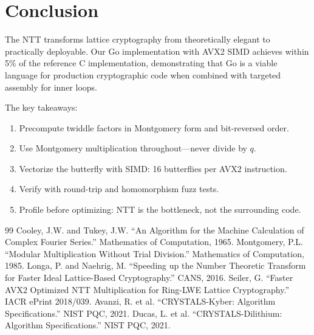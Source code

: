 \section{Conclusion}


The NTT transforms lattice cryptography from theoretically elegant to practically
deployable. Our Go implementation with AVX2 SIMD achieves within 5\% of the reference C
implementation, demonstrating that Go is a viable language for production cryptographic
code when combined with targeted assembly for inner loops.

The key takeaways:
\begin{enumerate}[nosep]
  \item Precompute twiddle factors in Montgomery form and bit-reversed order.
  \item Use Montgomery multiplication throughout---never divide by $q$.
  \item Vectorize the butterfly with SIMD: 16 butterflies per AVX2 instruction.
  \item Verify with round-trip and homomorphism fuzz tests.
  \item Profile before optimizing: NTT is the bottleneck, not the surrounding code.
\end{enumerate}

\begin{thebibliography}{99}
 Cooley, J.W. and Tukey, J.W. ``An Algorithm for the Machine Calculation of Complex Fourier Series.'' Mathematics of Computation, 1965.
 Montgomery, P.L. ``Modular Multiplication Without Trial Division.'' Mathematics of Computation, 1985.
 Longa, P. and Naehrig, M. ``Speeding up the Number Theoretic Transform for Faster Ideal Lattice-Based Cryptography.'' CANS, 2016.
 Seiler, G. ``Faster AVX2 Optimized NTT Multiplication for Ring-LWE Lattice Cryptography.'' IACR ePrint 2018/039.
 Avanzi, R. et al. ``CRYSTALS-Kyber: Algorithm Specifications.'' NIST PQC, 2021.
 Ducas, L. et al. ``CRYSTALS-Dilithium: Algorithm Specifications.'' NIST PQC, 2021.
\end{thebibliography}

